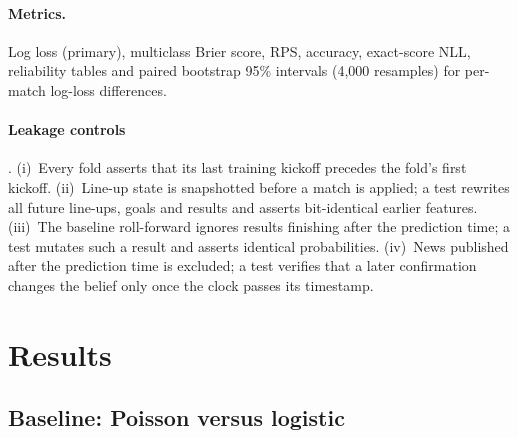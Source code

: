\documentclass[11pt,a4paper]{article}
\begin{document}
\paragraph{Metrics.}
Log loss (primary), multiclass Brier score, RPS, accuracy, exact-score NLL,
reliability tables and paired bootstrap 95\% intervals (4{,}000 resamples) for
per-match log-loss differences.

\paragraph{Leakage controls} \citep{kaufman2012}.
(i)~Every fold asserts that its last training kickoff precedes the fold's
first kickoff. (ii)~Line-up state is snapshotted before a match is applied; a
test rewrites all future line-ups, goals and results and asserts bit-identical
earlier features. (iii)~The baseline roll-forward ignores results finishing
after the prediction time; a test mutates such a result and asserts identical
probabilities. (iv)~News published after the prediction time is excluded; a
test verifies that a later confirmation changes the belief only once the clock
passes its timestamp.

\section{Results}\label{sec:results}

\subsection{Baseline: Poisson versus logistic}\label{sec:res-baseline}
\end{document}
